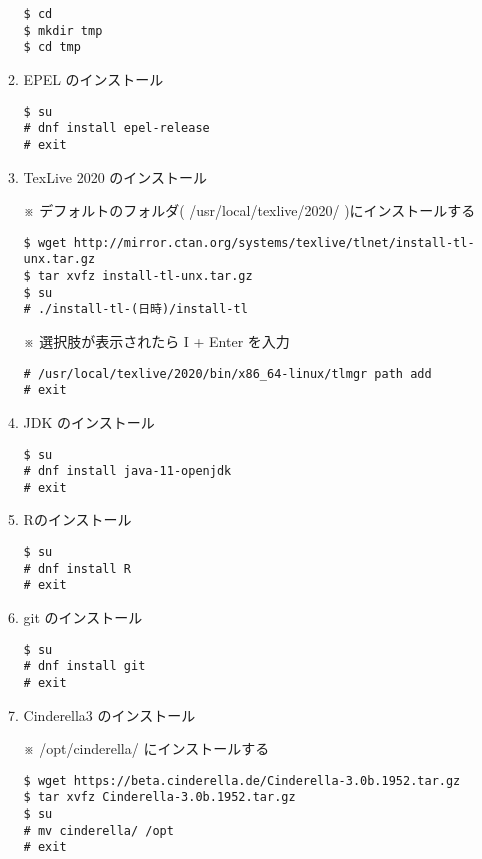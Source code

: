 \documentclass{ujarticle}
\begin{document}
\begin{enumerate}[\bf\large 1.]
\begin{enumerate}[(1)]
\begin{verbatim}
$ cd
$ mkdir tmp
$ cd tmp
\end{verbatim}

\item EPEL のインストール

\begin{verbatim}
$ su
# dnf install epel-release
# exit
\end{verbatim}

\item TexLive 2020 のインストール

※ デフォルトのフォルダ( /usr/local/texlive/2020/ )にインストールする

\begin{verbatim}
$ wget http://mirror.ctan.org/systems/texlive/tlnet/install-tl-unx.tar.gz
$ tar xvfz install-tl-unx.tar.gz
$ su
# ./install-tl-(日時)/install-tl
\end{verbatim}

※ 選択肢が表示されたら I + Enter を入力

\begin{verbatim}
# /usr/local/texlive/2020/bin/x86_64-linux/tlmgr path add
# exit
\end{verbatim}

\item JDK のインストール

\begin{verbatim}
$ su
# dnf install java-11-openjdk
# exit
\end{verbatim}

\item Rのインストール

\begin{verbatim}
$ su
# dnf install R
# exit
\end{verbatim}

\item git のインストール

\begin{verbatim}
$ su
# dnf install git
# exit
\end{verbatim}

\item Cinderella3 のインストール

※ /opt/cinderella/ にインストールする

\begin{verbatim}
$ wget https://beta.cinderella.de/Cinderella-3.0b.1952.tar.gz
$ tar xvfz Cinderella-3.0b.1952.tar.gz
$ su
# mv cinderella/ /opt
# exit
\end{verbatim}


\end{enumerate}
\end{enumerate}
\end{document}
